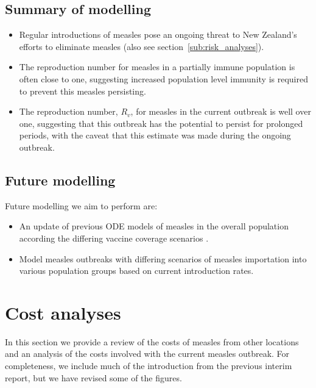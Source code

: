 \documentclass{article}
\begin{document}
\subsection{Summary of modelling}
\begin{itemize}
\item Regular introductions of measles pose an ongoing threat to New Zealand's efforts to eliminate measles (also see section~\ref{sub:risk_analyses}).
\item The reproduction number for measles in a partially immune population is often close to one, suggesting increased population level immunity is required to prevent this measles persisting.
 \item The reproduction number, $R_v$, for measles in the current outbreak is well over one, suggesting that this outbreak has the potential to persist for prolonged periods, with the caveat that this estimate was made during the ongoing outbreak.
\end{itemize}

\subsection{Future modelling}
Future modelling we aim to perform are:
\begin{itemize}
\item An update of previous ODE models of measles in the overall population according the differing vaccine coverage scenarios \citep{roberts4}.
\item Model measles outbreaks with differing scenarios of measles importation into various population groups based on current introduction rates.
\end{itemize}


\section{Cost analyses}

In this section we provide a review of the costs of measles from other locations and an analysis of the costs involved with the current measles outbreak. For completeness, we include much of the introduction from the previous interim report, but we have revised some of the figures.
\end{document}
